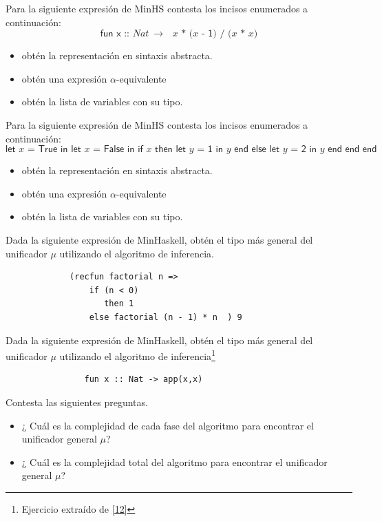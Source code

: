 	\begin{exercise}
		Para la siguiente expresión de \textsf{MinHS} contesta los incisos enumerados a continuación:
		\[
			\textsf{fun x :: $Nat\ \rightarrow$ $x$ * ($x$ - 1) / ($x$ * $x$)}
		\]
		\begin{itemize}
			\item obtén la representación en sintaxis abstracta.
			\item obtén una expresión $\alpha$-equivalente
			\item obtén la lista de variables con su tipo.
		\end{itemize}
	\end{exercise}

	\begin{exercise}
		Para la siguiente expresión de \textsf{MinHS} contesta los incisos enumerados a continuación:
		\[
			\textsf{let $x$ = True in let $x$ = False in if $x$ then let $y$ = 1 in $y$  end else let $y$ = 2 in $y$ end end end}
		\]
		\begin{itemize}
			\item obtén la representación en sintaxis abstracta.
			\item obtén una expresión $\alpha$-equivalente
			\item obtén la lista de variables con su tipo.
		\end{itemize}
	\end{exercise}

     \begin{exercise} Dada la siguiente expresión de MinHaskell, obtén el tipo más general del unificador $\mu$ utilizando el algoritmo de inferencia.
          \begin{lstlisting}
             (recfun factorial n => 
                 if (n < 0) 
                    then 1
                 else factorial (n - 1) * n  ) 9
           \end{lstlisting}
     \end{exercise}


    \begin{exercise} Dada la siguiente expresión de MinHaskell, obtén el tipo más general del unificador $\mu$ utilizando el algoritmo de inferencia\footnote{Ejercicio extraído de \hyperlink{12}{[12]}}
           \begin{lstlisting}
                fun x :: Nat -> app(x,x)
           \end{lstlisting} 
    \end{exercise}

   \begin{exercise} Contesta las siguientes preguntas.\\
	\begin{itemize}
	    \item ¿ Cuál es la complejidad de cada fase del algoritmo para encontrar el unificador general $\mu$?\\
           \item ¿ Cuál es la complejidad total del algoritmo para encontrar el unificador general $\mu$?
	\end{itemize}
   \end{exercise}
